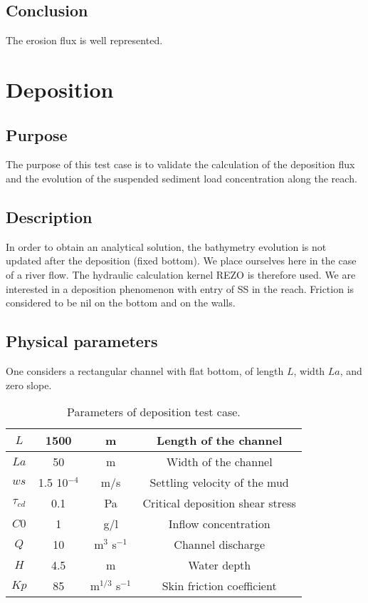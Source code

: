 \subsection{Conclusion}

The erosion flux is well represented.

\section{Deposition}

\subsection{Purpose}

The purpose of this test case is to validate the calculation of the
deposition flux and the evolution of the suspended sediment load
concentration along the reach.

\subsection{Description}

In order to obtain an analytical solution, the bathymetry evolution
is not updated after the deposition (fixed bottom). We place ourselves
here in the case of a river flow. The hydraulic calculation kernel
REZO is therefore used.
We are interested in a deposition phenomenon with entry of SS in the
reach. Friction is considered to be nil on the bottom and
on the walls.

\subsection{Physical parameters}

One considers a rectangular channel with flat bottom, of length $L$,
width $La$, and zero slope.

\begin{table}[h!] %
\begin{center}
\begin{tabular}{|c|c|c|c|} \hline
$L$&1500&m&Length of the channel \\ \hline
$La$&50&m&Width of the channel \\ \hline
$ws$&1.5 10$^{-4}$&m/s&Settling velocity of the mud \\ \hline
$\tau_{cd}$&0.1&Pa&Critical deposition shear stress \\ \hline
$C0$&1&g/l&Inflow concentration \\ \hline
$Q$&10&m$^{3}$ s$^{-1}$&Channel discharge \\ \hline
$H$&4.5&m&Water depth \\ \hline
$Kp$&85&m$^{1/3}$ s$^{-1}$&Skin friction coefficient \\ \hline
\end{tabular}
\caption{ Parameters of deposition test case. }
\end{center}
\label{}
\end{table}

